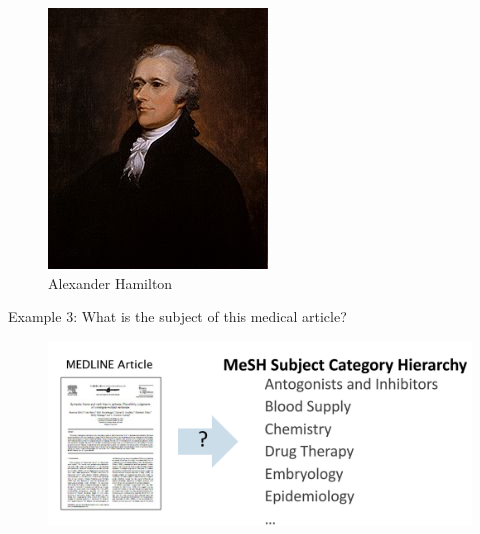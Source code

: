 \begin{center}
\begin{figure}[h]
\begin{minipage}{0.3\textwidth}
                \includegraphics[width=\linewidth]{pics/hamilton.png}
                \caption{Alexander Hamilton}
            \end{minipage}
        \end{figure}
    \end{center}


Example 3: What is the subject of this medical article?

\begin{figure}[h]
\includegraphics[scale = 0.2]{pics/medarticle.png}
\end{figure}



